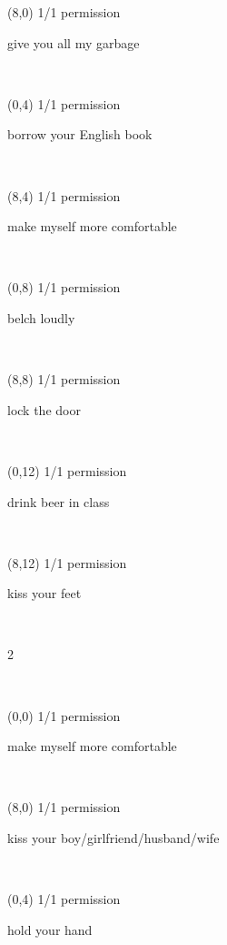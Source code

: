 \documentclass[a4paper]{article}
\newcommand{\mycard}[5]{%
	\vspace{0.1cm}
	\small #1 #2
	\par
	\parbox[t][6.7cm][c]{9.5cm}{%
	\hspace{0.1cm} \Large#3\\
	\normalsize#4 #5
	}
}
\begin{document}
\begin{textblock}{8}(8,0)
\mycard{1/1}{permission}{\parbox{9.0cm}{
give you all my garbage
}}{}{} 
\end{textblock}

\begin{textblock}{8}(0,4)
\mycard{1/1}{permission}{\parbox{9.0cm}{
borrow your English book
}}{}{} 
\end{textblock}

\begin{textblock}{8}(8,4)
\mycard{1/1}{permission}{\parbox{9.0cm}{
make myself more comfortable
}}{}{} 
\end{textblock}

\begin{textblock}{8}(0,8)
\mycard{1/1}{permission}{\parbox{9.0cm}{
belch loudly
}}{}{} 
\end{textblock}

\begin{textblock}{8}(8,8)
\mycard{1/1}{permission}{\parbox{9.0cm}{
lock the door
}}{}{} 
\end{textblock}

\begin{textblock}{8}(0,12)
\mycard{1/1}{permission}{\parbox{9.0cm}{
drink beer in class
}}{}{} 
\end{textblock}

\begin{textblock}{8}(8,12)
\mycard{1/1}{permission}{\parbox{9.0cm}{
kiss your feet
}}{}{} 
\end{textblock}

\begin{tiny}2\end{tiny}\\
\newpage

\begin{textblock}{8}(0,0)
\mycard{1/1}{permission}{\parbox{9.0cm}{
make myself more comfortable
}}{}{} 
\end{textblock}

\begin{textblock}{8}(8,0)
\mycard{1/1}{permission}{\parbox{9.0cm}{
kiss your boy/girlfriend/husband/wife
}}{}{} 
\end{textblock}

\begin{textblock}{8}(0,4)
\mycard{1/1}{permission}{\parbox{9.0cm}{
hold your hand
}}{}{} 
\end{textblock}
\end{document}
